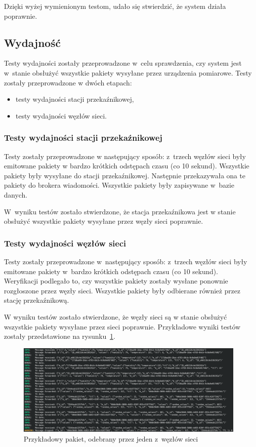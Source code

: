 Dzięki wyżej wymienionym testom, udało się stwierdzić, że system działa poprawnie.

\subsection{Wydajność}
Testy wydajności zostały przeprowadzone w~celu sprawdzenia, czy system jest w~stanie obsłużyć wszystkie pakiety wysyłane przez urządzenia pomiarowe.
Testy zostały przeprowadzone w dwóch etapach:
\begin{itemize}
    \item testy wydajności stacji przekaźnikowej,
    \item testy wydajności węzłów sieci.
\end{itemize}

\subsubsection{Testy wydajności stacji przekaźnikowej}
Testy zostały przeprowadzone w następujący sposób: z~trzech węzłów sieci były emitowane pakiety w bardzo krótkich odstępach czasu (co 10 sekund).
Wszystkie pakiety były wysyłane do stacji przekaźnikowej.
Następnie przekazywała ona te pakiety do brokera wiadomości.
Wszystkie pakiety były zapisywane w~bazie danych.

W~wyniku testów zostało stwierdzone, że stacja przekaźnikowa jest w stanie obsłużyć wszystkie pakiety wysyłane przez węzły sieci poprawnie.

\subsubsection{Testy wydajności węzłów sieci}
Testy zostały przeprowadzone w~następujący sposób: z~trzech węzłów sieci były emitowane pakiety w~bardzo krótkich odstępach czasu (co 10 sekund).
Weryfikacji podlegało to, czy wszystkie pakiety zostały wysłane ponownie rozgłoszone przez węzły sieci.
Wszystkie pakiety były odbierane również przez stację przekaźnikową.

W wyniku testów zostało stwierdzone, że węzły sieci są w stanie obsłużyć wszystkie pakiety wysyłane przez sieci poprawnie.
Przykładowe wyniki testów zostały przedstawione na rysunku~\ref{rys:odbijanie-pakietu}.

\begin{figure}[b!]
    \begin{center}
        \includegraphics[width=13cm]{pic/odbijanie-pakietu.png}
    \end{center}
    \caption{Przykładowy pakiet, odebrany przez jeden z~węzłów sieci}\label{rys:odbijanie-pakietu}
\end{figure}

